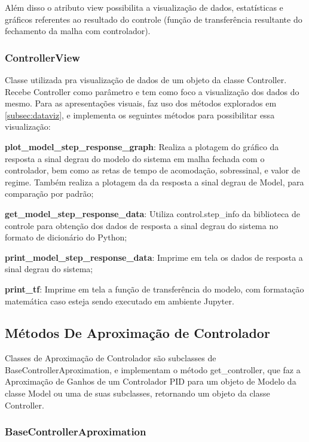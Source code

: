 Além disso o atributo view possibilita a visualização de dados, estatísticas e gráficos referentes ao resultado do
controle (função de transferência resultante do fechamento da malha com controlador).

\subsubsection{ControllerView}

Classe utilizada pra visualização de dados de um objeto da classe Controller.
Recebe Controller como parâmetro e tem como foco a visualização dos dados do mesmo.
Para as apresentações visuais, faz uso dos métodos explorados em \ref{subsec:dataviz}, e implementa os seguintes
métodos para possibilitar essa visualização:
\begin{alineas}
    \item \textbf{plot\_model\_step\_response\_graph}: Realiza a plotagem do gráfico da resposta a sinal degrau do
    modelo do sistema em malha fechada com o controlador, bem como as retas de tempo de acomodação, sobressinal, e valor
    de regime.
    Também realiza a plotagem da da resposta a sinal degrau de Model, para comparação por padrão;
    \item \textbf{get\_model\_step\_response\_data}: Utiliza control.step\_info da biblioteca de controle para
    obtenção dos dados de resposta a sinal degrau do sistema no formato de dicionário do Python;
    \item \textbf{print\_model\_step\_response\_data}: Imprime em tela os dados de resposta a sinal degrau do sistema;
    \item \textbf{print\_tf}: Imprime em tela a função de transferência do modelo, com formatação matemática caso
    esteja sendo executado em ambiente Jupyter.
\end{alineas}

\subsection{Métodos De Aproximação de Controlador}

Classes de Aproximação de Controlador são subclasses de BaseControllerAproximation, e implementam o método
get\_controller, que faz a Aproximação de Ganhos de um Controlador PID para um objeto de Modelo da classe Model ou
uma de suas subclasses, retornando um objeto da classe Controller.

\subsubsection{BaseControllerAproximation}

